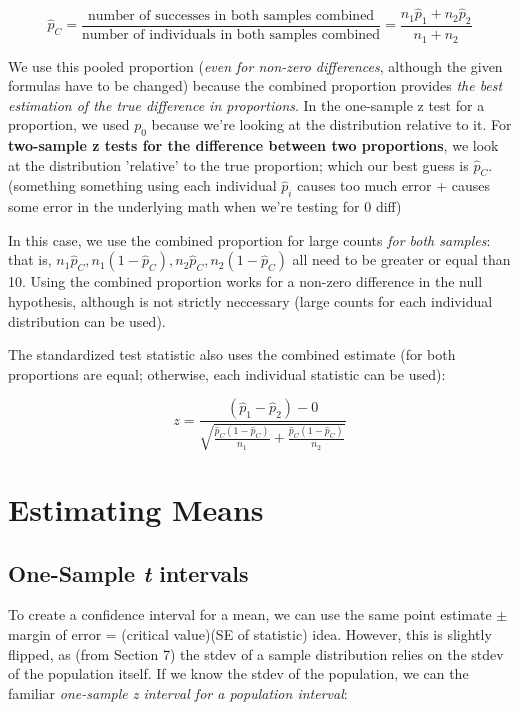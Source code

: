 \documentclass[12pt, a4paper]{article}
\theoremstyle{definition}
\begin{document}
\[\hat{p}_C = \frac{\textrm{number of successes in both samples combined}}{\textrm{number of individuals in both samples combined}} = \frac{n_1 \hat{p}_1 + n_2 \hat{p}_2}{n_1 + n_2}\]

We use this pooled proportion (\textit{even for non-zero differences}, although the given formulas have to be changed) because the combined proportion provides \textit{the best estimation of the true difference in proportions}.
In the one-sample z test for a proportion, we used $p_0$ because we're looking at the distribution relative to it.
For \textbf{two-sample z tests for the difference between two proportions}, we look at the distribution 'relative' to the true proportion; which our best guess is $\hat{p}_C$.
(something something using each individual $\hat{p}_i$ causes too much error + causes some error in the underlying math when we're testing for 0 diff)

In this case, we use the combined proportion for large counts \textit{for both samples}: that is, $n_1 \hat{p}_C, n_1 (1 - \hat{p}_C), n_2 \hat{p}_C, n_2 (1 - \hat{p}_C)$ all need to be greater or equal than 10.
Using the combined proportion works for a non-zero difference in the null hypothesis, although is not strictly neccessary (large counts for each individual distribution can be used).

The standardized test statistic also uses the combined estimate (for both proportions are equal; otherwise, each individual statistic can be used):

\[z = \frac{(\hat{p}_1 - \hat{p}_2) - 0}{\sqrt{\frac{\hat{p}_C (1 - \hat{p}_C)}{n_1} + \frac{\hat{p}_C (1 - \hat{p}_C)}{n_2}}}\]

\newpage

\section{Estimating Means}

\subsection{One-Sample \textit{t} intervals}

To create a confidence interval for a mean, we can use the same point estimate $\pm$ margin of error = (critical value)(SE of statistic) idea.
However, this is slightly flipped, as (from Section 7) the stdev of a sample distribution relies on the stdev of the population itself.
If we know the stdev of the population, we can the familiar \textit{one-sample z interval for a population interval}:
\end{document}
